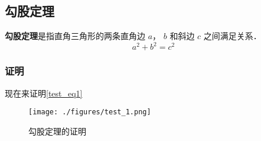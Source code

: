 
\subsection{勾股定理}
\textbf{勾股定理}是指直角三角形的两条直角边 $a$， $b$ 和斜边 $c$ 之间满足关系．
\begin{equation}\label{test_eq1}
a^2 + b^2 = c^2
\end{equation}

\subsubsection{证明}
现在来证明\autoref{test_eq1}

\begin{figure}[ht]
\centering
\texttt{[image: ./figures/test\_1.png]}
\caption{勾股定理的证明} \label{test_fig1}
\end{figure}

